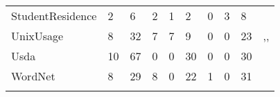 \begin{table*}[t]
\begin{tabular}{llllllllll}
StudentResidence & 2 & 6  &     2        &     1        &    2      &   0     &    3   & 8 &  \cite{kapfhammer2013search} \\
UnixUsage & 8  & 32       &     7        &     7        &    9      &   0     &   0    & 23 &  \cite{kapfhammer2013search},\cite{wright2013efficient},\cite{wright2014impact} \\
Usda & 10   & 67          &       0      &        0     &  30       &    0    &   0    & 30 & \cite{kapfhammer2013search}  \\
WordNet & 8 & 29          &        8     &       0      &  22       &    1    &   0    & 31 & \cite{wright2014impact} \\
       &        &         &              &              &           &         &        &  &   \\
\end{tabular}
\end{table*}
